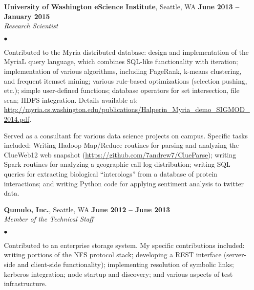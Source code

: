 \documentclass[margin,line]{res}
\newenvironment{list2}{
  \begin{list}{$\bullet$}{%
      \setlength{\itemsep}{0in}
      \setlength{\parsep}{0in} \setlength{\parskip}{0in}
      \setlength{\topsep}{0in} \setlength{\partopsep}{0in} 
      \setlength{\leftmargin}{0.2in}}}{\end{list}}
\begin{document}
\begin{resume}
\textbf{University of Washington eScience Institute}, Seattle, WA \hfill \textbf{June 2013 -- January 2015} \\\vspace{-4mm}
\textsl{Research Scientist} \\
\begin{list2}
\item Contributed to the Myria distributed database: design and implementation of the MyriaL query language, which combines SQL-like functionality with iteration; implementation of various algorithms, including PageRank, k-means clustering, and frequent itemset mining; various rule-based optimizations (selection pushing, etc.); simple user-defined functions; database operators for set intersection, file scan; HDFS integration.  Details available at:\\
\url{http://myria.cs.washington.edu/publications/Halperin_Myria_demo_SIGMOD_2014.pdf}.

\item Served as a consultant for various data science projects on campus.  Specific tasks included: Writing Hadoop Map/Reduce routines for parsing and analyzing the ClueWeb12 web snapshot (\url{https://github.com/7andrew7/ClueParse}); writing Spark routines for analyzing a geographic call log distribution; writing SQL queries for extracting biological ``interologs'' from a database of protein interactions; and writing Python code for applying sentiment analysis to twitter data.
\end{list2}

\textbf{Qumulo, Inc.}, Seattle, WA \hfill \textbf{June 2012 -- June 2013} \\\vspace{-4mm}
\textsl{Member of the Technical Staff}  \\
\begin{list2}
  \item Contributed to an enterprise storage system.  My specific contributions included: writing
    portions of the NFS protocol stack; developing a REST interface (server-side and client-side functionality); implementing resolution of symbolic links; kerberos
    integration; node startup and discovery; and various aspects of test infrastructure.
  \end{list2}


\end{resume}
\end{document}
